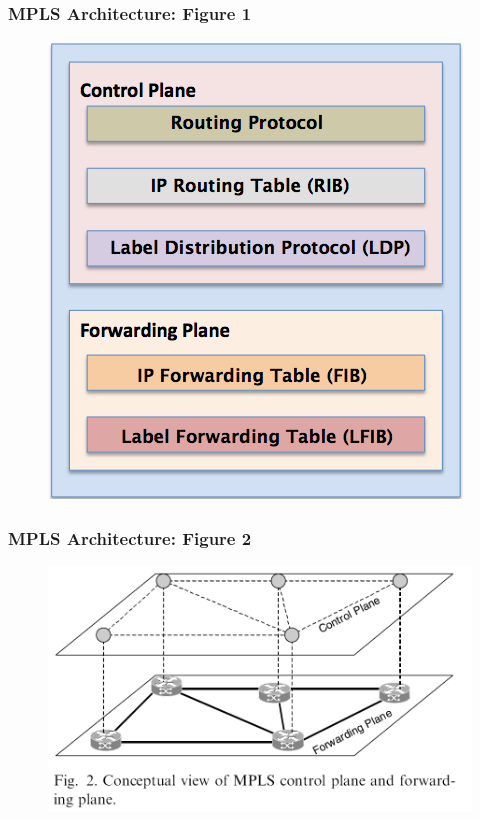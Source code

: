 \documentclass[12pt]{beamer}
\begin{document}
\begin{frame}
	\frametitle{MPLS Architecture: Figure 1}
		\begin{figure}[h]
			\begin{center}
				\includegraphics[scale=0.40]{mpls-arch.png}
			\end{center}
		\end{figure}	
\end{frame}

\begin{frame}
	\frametitle{MPLS Architecture: Figure 2}
		\begin{figure}[h]
			\begin{center}
				\includegraphics[scale=0.40]{separation.png}
			\end{center}
		\end{figure}
\end{frame}
\end{document}
